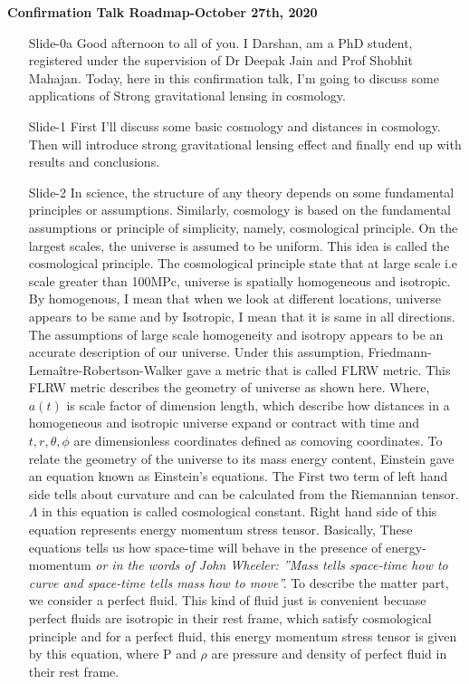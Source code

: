 \documentclass[12pt]{report}
\begin{document}
\begin{Large}
\textbf{Confirmation Talk Roadmap-October 27th, 2020} 
\end{Large}
\vspace{5mm}
\begin{itemize}
 \item[\ding{74} {\footnotesize Slide-0a}]
 Good afternoon to all of you. I Darshan, am a PhD student, registered  under the supervision of Dr Deepak Jain and Prof Shobhit Mahajan.  Today, here in this confirmation talk, I'm going to discuss some applications of Strong gravitational lensing in cosmology.
 \item[\ding{74} Slide-1]
 First I'll discuss some basic cosmology and distances in cosmology. Then will introduce strong gravitational lensing effect and finally end up with results and conclusions. 

\item[\ding{74} Slide-2]
In science, the structure of any theory depends on some fundamental principles or assumptions. Similarly, cosmology is based on the fundamental assumptions or principle of simplicity, namely, cosmological principle. On the largest scales, the universe is assumed to be uniform. This idea is called the cosmological principle. The cosmological principle state that at large scale i.e scale greater than 100MPc, universe is spatially homogeneous and isotropic. By homogenous, I mean that when we look at different locations, universe appears to be same and by Isotropic, I mean that it is same in all directions. The assumptions of large scale homogeneity and isotropy appears to be an accurate description of our universe. Under this assumption, Friedmann-Lema\^{i}tre-Robertson-Walker gave a metric that is called FLRW metric. This FLRW metric describes the geometry of universe as shown here. Where, $a(t)$ is scale factor of dimension length, which describe how distances in a homogeneous and isotropic universe expand or contract with time and $t, r, \theta, \phi$ are dimensionless coordinates defined as comoving coordinates. To relate the geometry of the universe to its mass energy content, Einstein gave an equation known as Einstein’s equations. The First two term of left hand side tells about curvature and can be calculated from the Riemannian tensor. $\Lambda$ in this equation is called cosmological constant. Right hand side of this equation represents energy momentum stress tensor. Basically, These equations tells us how space-time will behave in the presence of energy-momentum \textit{or in the words of John Wheeler: ”Mass tells space-time how to curve and space-time tells mass how to move”.} To describe the matter part, we consider a perfect fluid. This kind of fluid just is convenient becuase perfect fluids are isotropic in their rest frame, which satisfy cosmological principle and for a perfect fluid, this energy momentum stress tensor is given by this equation, where P and $\rho$ are pressure and density of perfect fluid in their rest frame.


\end{itemize}
\end{document}
